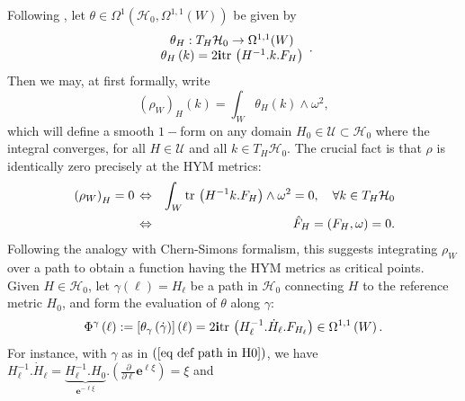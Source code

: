 \documentclass{article}
\newcommand{\func}[1]{\textnormal {#1\,}}
\newcommand{\e}[1]{\mathbf{e}^{#1}}
\begin{document}
Following \cite[pp.8-11]{ASDYM}, let $\theta \in \Omega ^{1}\left( \mathcal{H}_{0},\Omega ^{1,1}\left(
W\right) \right)$ be given by 
\begin{equation}        \label{eq def theta_H}      
\begin{array}{c}
        \theta _{H} : T_{H}\mathcal{H}_{0}\rightarrow \Omega ^{1,1}(W)\\
        \theta _{H}\left( k\right) 
        = 2\mathbf{i}\func{tr}\left(H^{-1}.k.F_{H}\right)
\end{array}.
\end{equation}
Then we may, at first formally, write
\begin{equation}        \label{eq def rhoW}
        \left( \rho _{W}\right) _{H}\left( k\right) 
        =\int_{W}\theta _{H}\left(k\right) \wedge \omega ^{2},
\end{equation}%
which will define a smooth $1-$form on any domain $H_0\in\mathcal{U}\subset 
\mathcal{H}_{0}$ where the integral converges, for all $H\in \mathcal{U}$ and all $k\in T_{H}\mathcal{H}_{0}$. The
crucial fact is that $\rho $ is identically zero precisely at the HYM metrics:
\begin{eqnarray*}
        \left. \left( \rho _{W}\right) _{H}=0\right.  &\Leftrightarrow &
        \int_{W}\func{tr}\left(H^{-1}k.F_{H}\right)\wedge \omega ^{2}=0,
        \quad \forall k\in T_{H}\mathcal{H}_{0} \\
        &\Leftrightarrow &\hat{F}_{H}=\left( F_{H},\omega \right) =0.
\end{eqnarray*}%
Following the analogy with Chern-Simons formalism, this suggests
integrating $\rho _{W}$ over a path to obtain a function having the HYM
metrics as critical points. Given $H\in \mathcal{H}_{0}$, let $%
\gamma \left( \ell \right) =H_{\ell }$ be a path in $\mathcal{H}_{0}$ connecting $H$ to the reference
metric $H_{0}$, and form the evaluation of $\theta $ along $\gamma $:%
\begin{equation}        \label{eq def Phizao of l}
        \Phi ^{\gamma }\left( \ell \right) := 
        \left[ \theta _{\gamma }\left(\dot{\gamma}\right) \right] 
        \left( \ell \right) =2\mathbf{i}\func{tr}%
        \left( H_{\ell }^{-1}.\dot{H}_{\ell }.F_{H_{\ell }}\right) 
        \in \Omega^{1,1}\left( W\right) .
\end{equation}%
For instance, with $\gamma $ as in $\left( \ref{eq def path in H0}\right)$,
we have $H_\ell^{-1}.\dot{H}_{\ell }=\underset{\e{-\ell \xi}}{\underbrace{H_\ell^{-1}.H_0}}. \left(\frac{\partial}{\partial\ell} \e{\ell\xi}\right)=\xi$ and
\end{document}
